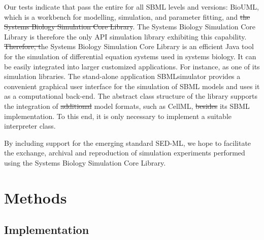 \documentclass[10pt]{bmc_article}
\newenvironment{bmcformat}{\fussy\setboolean{publ}{true}}{\fussy}
\begin{document}
\begin{bmcformat}
Our tests indicate that  pass the
entire  for all \acs{SBML} levels and versions: BioUML, which is
a workbench for modelling, simulation, and parameter fitting, and
\sout{the Systems Biology Simulation Core Library}.
The Systems Biology Simulation Core Library is therefore the only \acs{API}
simulation library exhibiting this capability.
%
\sout{Therefore, t}he Systems Biology Simulation Core
Library is an efficient Java tool for the simulation of differential equation
systems used in systems biology.
It can be easily integrated into larger customized applications.
For instance,  as one of its  simulation libraries.
The stand-alone application SBMLsimulator 
provides a convenient graphical user interface for the simulation of \acs{SBML}
models and uses it as a computational back-end.
The abstract class structure of the library supports the integration of
\sout{additional} model formats, such as CellML,
\sout{besides} its \acs{SBML} implementation.
To this end, it is only necessary to implement a suitable interpreter class.



By including support for the emerging standard \acs{SED-ML}, we hope to
facilitate the exchange, archival and reproduction of simulation experiments
performed using the Systems Biology Simulation Core Library.

\section*{Methods}

\subsection*{Implementation}


\end{bmcformat}
\end{document}
